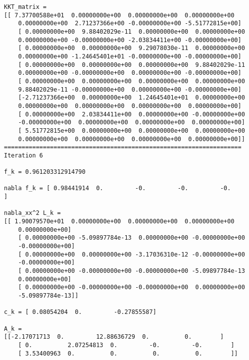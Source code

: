 \documentclass{article}
\begin{document}
\begin{verbatim}
KKT_matrix = 
[[ 7.37700588e+01  0.00000000e+00  0.00000000e+00  0.00000000e+00
    0.00000000e+00  2.71237366e+00 -0.00000000e+00 -5.51772815e+00]
    [ 0.00000000e+00  9.88402029e-11  0.00000000e+00  0.00000000e+00
    0.00000000e+00 -0.00000000e+00 -2.03834411e+00 -0.00000000e+00]
    [ 0.00000000e+00  0.00000000e+00  9.29078030e-11  0.00000000e+00
    0.00000000e+00 -1.24645401e+01 -0.00000000e+00 -0.00000000e+00]
    [ 0.00000000e+00  0.00000000e+00  0.00000000e+00  9.88402029e-11
    0.00000000e+00 -0.00000000e+00  0.00000000e+00 -0.00000000e+00]
    [ 0.00000000e+00  0.00000000e+00  0.00000000e+00  0.00000000e+00
    9.88402029e-11 -0.00000000e+00  0.00000000e+00 -0.00000000e+00]
    [-2.71237366e+00  0.00000000e+00  1.24645401e+01  0.00000000e+00
    0.00000000e+00  0.00000000e+00  0.00000000e+00  0.00000000e+00]
    [ 0.00000000e+00  2.03834411e+00  0.00000000e+00 -0.00000000e+00
    -0.00000000e+00  0.00000000e+00  0.00000000e+00  0.00000000e+00]
    [ 5.51772815e+00  0.00000000e+00  0.00000000e+00  0.00000000e+00
    0.00000000e+00  0.00000000e+00  0.00000000e+00  0.00000000e+00]]
===================================================================
Iteration 6

f_k = 0.961203312914790

nabla f_k = [ 0.98441914  0.         -0.         -0.         -0.        ]

nabla_xx^2 L_k = 
[[ 1.90079570e+01  0.00000000e+00  0.00000000e+00  0.00000000e+00
    0.00000000e+00]
    [ 0.00000000e+00 -5.09897784e-13  0.00000000e+00 -0.00000000e+00
    -0.00000000e+00]
    [ 0.00000000e+00  0.00000000e+00 -3.17036310e-12 -0.00000000e+00
    -0.00000000e+00]
    [ 0.00000000e+00 -0.00000000e+00 -0.00000000e+00 -5.09897784e-13
    0.00000000e+00]
    [ 0.00000000e+00 -0.00000000e+00 -0.00000000e+00  0.00000000e+00
    -5.09897784e-13]]

c_k = [ 0.08054204  0.         -0.27855587]

A_k = 
[[-2.17071713  0.         12.88636729  0.          0.        ]
    [ 0.          2.07254813  0.         -0.         -0.        ]
    [ 3.53400963  0.          0.          0.          0.        ]]


\end{verbatim}
\end{document}
